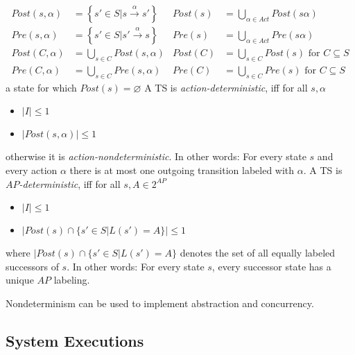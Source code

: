 \documentclass[a4paper, 10pt]{article}
\begin{document}
\begin{mdframed}[roundcorner=5pt,
subtitlebelowline=false,subtitleaboveline=false,
subtitlebackgroundcolor=blue!50,
frametitlerule=true,
frametitlebackgroundcolor=blue!50,
frametitle={Predecessors and Successors}
]
\begin{align*}
Post(s,\alpha)&= \left\{ s'\in S | s\overset{\alpha}{\longrightarrow}s' \right\} &
Post(s) &= \bigcup_{\alpha\in Act} Post(s\alpha)
\\
Pre(s,\alpha)&= \left\{ s'\in S | s'\overset{\alpha}{\longrightarrow}s \right\} &
Pre(s) &= \bigcup_{\alpha\in Act} Pre(s\alpha)
\\
Post(C,\alpha) &= \bigcup_{s\in C} Post(s,\alpha) &
Post(C) &= \bigcup_{s\in C} Post(s) \text{ for } C\subseteq S
\\
Pre(C,\alpha) &= \bigcup_{s\in C} Pre(s,\alpha) &
Pre(C) &= \bigcup_{s\in C} Pre(s) \text{ for } C\subseteq S
\end{align*}
a state for which $Post(s)=\varnothing$
A TS is \emph{action-deterministic}, iff for all $s,\alpha$
\begin{itemize}
    \item $|I|\leq 1$
    \item $|Post(s,\alpha)|\leq 1$
\end{itemize}
otherwise it is \emph{action-nondeterministic}. In other words: For every state $s$ and every action $\alpha$ there is at most one outgoing transition labeled with $\alpha$.
A TS is \emph{$AP$-deterministic}, iff for all $s,A\in 2^{AP}$
\begin{itemize}
    \item $|I|\leq 1$
    \item $|Post(s)\cap\{ s'\in S | L(s')=A \} | \leq 1$
\end{itemize}
where $|Post(s)\cap\{ s'\in S | L(s')=A \}$ denotes the set of all equally labeled successors of $s$. In other words: For every state $s$, every successor state has a unique $AP$ labeling.
\end{mdframed}

Nondeterminism can be used to implement abstraction and concurrency.

\subsection{System Executions}
\end{document}
